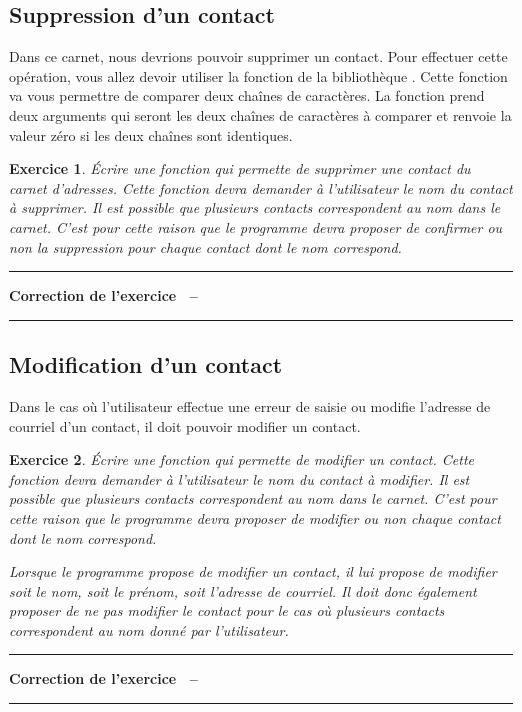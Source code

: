 \documentclass[a4paper]{article}
\newenvironment{Correction}{\par\tiny\blue\rule[1ex]{\textwidth}{1pt}\par\normalsize\textbf{Correction de l'exercice~\theExo{} -- }}{\par\tiny\blue\rule[1ex]{\textwidth}{1pt}\par}
\newtheorem{Exo}{Exercice}
\begin{document}
		\subsection{Suppression d'un contact}
			Dans ce carnet, nous devrions pouvoir supprimer un contact.
			Pour effectuer cette opération, vous allez devoir utiliser la fonction  de la bibliothèque .
			Cette fonction va vous permettre de comparer deux chaînes de caractères.
			La fonction prend deux arguments qui seront les deux chaînes de caractères à comparer et renvoie la valeur zéro si les deux chaînes sont identiques.
			\begin{Exo}
				Écrire une fonction qui permette de supprimer une contact du carnet d'adresses.
				Cette fonction devra demander à l'utilisateur le nom du contact à supprimer.
				Il est possible que plusieurs contacts correspondent au nom dans le carnet.
				C'est pour cette raison que le programme devra proposer de confirmer ou non la suppression pour chaque contact dont le nom correspond.
			\end{Exo}
			\begin{Correction}
			\end{Correction}
		\subsection{Modification d'un contact}
			Dans le cas où l'utilisateur effectue une erreur de saisie ou modifie l'adresse de courriel d'un contact, il doit pouvoir modifier un contact.
			\begin{Exo}
				Écrire une fonction qui permette de modifier un contact.
				Cette fonction devra demander à l'utilisateur le nom du contact à modifier.
				Il est possible que plusieurs contacts correspondent au nom dans le carnet.
				C'est pour cette raison que le programme devra proposer de modifier ou non chaque contact dont le nom correspond.

				Lorsque le programme propose de modifier un contact, il lui propose de modifier soit le nom, soit le prénom, soit l'adresse de courriel.
				Il doit donc également proposer de ne pas modifier le contact pour le cas où plusieurs contacts correspondent au nom donné par l'utilisateur.
			\end{Exo}
			\begin{Correction}
			\end{Correction}
\end{document}
